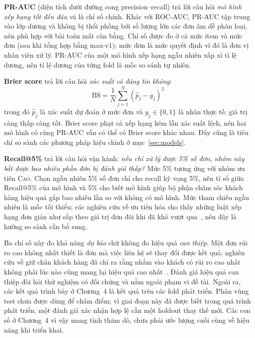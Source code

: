 \documentclass[12pt,a4paper]{report}
\begin{document}
\textbf{PR-AUC} (diện tích dưới đường cong precision--recall) trả lời câu hỏi \emph{mô hình xếp hạng tốt đến đâu} và là chỉ số chính. Khác với ROC-AUC, PR-AUC tập trung vào lớp dương và không bị thổi phồng bởi số lượng lớn các đơn âm dễ phân loại, nên phù hợp với bài toán mất cân bằng. Chỉ số được đo ở cả mức item và mức đơn (sau khi tổng hợp bằng max-v1); mức đơn là mức quyết định vì đó là đơn vị nhân viên xử lý. PR-AUC của một mô hình xếp hạng ngẫu nhiên xấp xỉ tỉ lệ dương, nên tỉ lệ dương của từng fold là mốc so sánh tự nhiên.

\textbf{Brier score} trả lời câu hỏi \emph{xác suất có đáng tin không}:
\begin{equation}\label{eq:brier}
  \mathrm{BS} = \frac{1}{N}\sum_{j=1}^{N}\left(\hat{p}_j - y_j\right)^2
\end{equation}
trong đó $\hat p_j$ là xác suất dự đoán ở mức đơn và $y_j \in \{0,1\}$ là nhãn thực tế; giá trị càng thấp càng tốt. Brier score phạt cả xếp hạng kém lẫn xác suất lệch, nên hai mô hình có cùng PR-AUC vẫn có thể có Brier score khác nhau. Đây cũng là tiêu chí so sánh các phương pháp hiệu chỉnh ở mục~\ref{sec:models}.

\textbf{Recall@5\%} trả lời câu hỏi vận hành: \emph{nếu chỉ xử lý được 5\% số đơn, nhóm này bắt được bao nhiêu phần đơn bị đánh giá thấp?} Mức 5\% tương ứng với nhóm ưu tiên \textsc{Cao}. Chọn ngẫu nhiên 5\% số đơn chỉ cho recall kỳ vọng 5\%, nên tỉ số giữa Recall@5\% của mô hình và 5\% cho biết mô hình giúp bộ phận chăm sóc khách hàng hiệu quả gấp bao nhiêu lần so với không có mô hình. Mức tham chiếu ngẫu nhiên là mốc tối thiểu; các nghiên cứu về ưu tiên hóa cho thấy những luật xếp hạng đơn giản như sắp theo giá trị đơn đôi khi đã khó vượt qua~\cite{li2026valuesorting}, nên đây là hướng so sánh cần bổ sung.

Ba chỉ số này đo khả năng \emph{dự báo} chứ không đo hiệu quả \emph{can thiệp}. Một đơn rủi ro cao không nhất thiết là đơn mà việc liên hệ sẽ thay đổi được kết quả; nghiên cứu về giữ chân khách hàng đã chỉ ra rằng nhắm vào khách có rủi ro cao nhất không phải lúc nào cũng mang lại hiệu quả cao nhất~\cite{ascarza2018}. Đánh giá hiệu quả can thiệp đòi hỏi thử nghiệm có đối chứng và nằm ngoài phạm vi đề tài. Ngoài ra, các kết quả trình bày ở Chương~4 là kết quả trên các fold phát triển. Phân vùng test chưa được dùng để chấm điểm; vì giai đoạn này đã được biết trong quá trình phát triển, một đánh giá xác nhận hợp lệ cần một holdout thay thế mới. Các con số ở Chương~4 vì vậy mang tính thăm dò, chưa phải ước lượng cuối cùng về hiệu năng khi triển khai.
 
\end{document}
